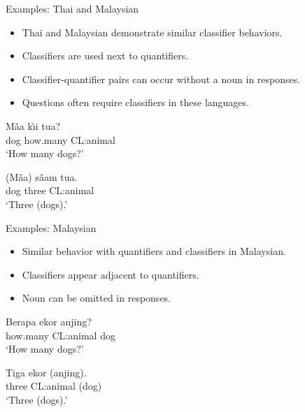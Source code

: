 \documentclass{beamer}
\begin{document}
\begin{frame}{Examples: Thai and Malaysian}
\begin{itemize}
    \item Thai and Malaysian demonstrate similar classifier behaviors.
    \item Classifiers are used next to quantifiers.
    \item Classifier-quantifier pairs can occur without a noun in responses.
    \item Questions often require classifiers in these languages.
\end{itemize}
\begin{exe}
  \ex
\gll Mǎa kı̀i tua? \\
 dog how.many CL:animal \\
\trans ‘How many dogs?’ 

\ex
\gll (Mǎa) sǎam tua. \\
    dog three CL:animal \\
\trans ‘Three (dogs).’ 
\end{exe}
\end{frame}

\begin{frame}{Examples: Malaysian}
\begin{itemize}
    \item Similar behavior with quantifiers and classifiers in Malaysian.
    \item Classifiers appear adjacent to quantifiers.
    \item Noun can be omitted in responses.
\end{itemize}
\begin{exe}
\ex
\gll Berapa ekor anjing? \\
    how.many CL:animal dog \\
\trans ‘How many dogs?’ 
\end{exe}
\begin{exe}
\ex
\gll Tiga ekor (anjing). \\
    three CL:animal (dog) \\
\trans ‘Three (dogs).’ 
\end{exe}
\end{frame}
\end{document}
